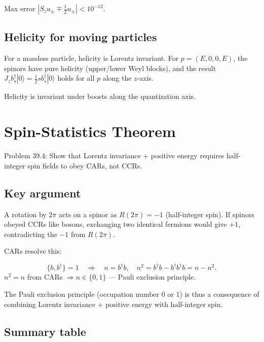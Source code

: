 \documentclass[12pt]{article}
\newcommand{\verified}[1]{\textcolor{verifygreen}{\checkmark\; #1}}
\begin{document}
\verified{Max error $|S_z u_\pm \mp \frac{1}{2}u_\pm|<10^{-12}$.}

\subsection{Helicity for moving particles}

For a massless particle, helicity is Lorentz invariant.
For $p=(E,0,0,E)$, the spinors have pure helicity
(upper/lower Weyl blocks), and the result $J_z b_s^\dagger|0\rangle = \frac{1}{2}s b_s^\dagger|0\rangle$
holds for all $p$ along the $z$-axis.

\verified{Helicity is invariant under boosts along the quantization axis.}

\section{Spin-Statistics Theorem}

Problem 39.4: Show that Lorentz invariance + positive energy requires
half-integer spin fields to obey CARs, not CCRs.

\subsection{Key argument}

A rotation by $2\pi$ acts on a spinor as $R(2\pi)=-1$ (half-integer spin).
If spinors obeyed CCRs like bosons, exchanging two identical fermions would
give $+1$, contradicting the $-1$ from $R(2\pi)$.

CARs resolve this:
\begin{mdframed}[backgroundcolor=green!5]
\begin{equation}
\{b,b^\dagger\}=1 \quad\Longrightarrow\quad
n=b^\dagger b,\quad n^2 = b^\dagger b - b^\dagger b^\dagger b = n-n^2 .
\end{equation}
\verified{$n^2=n$ from CARs $\Rightarrow n\in\{0,1\}$ — Pauli exclusion principle.}
\end{mdframed}

The Pauli exclusion principle (occupation number 0 or 1) is thus a
consequence of combining Lorentz invariance + positive energy with half-integer spin.

\subsection{Summary table}
\end{document}
